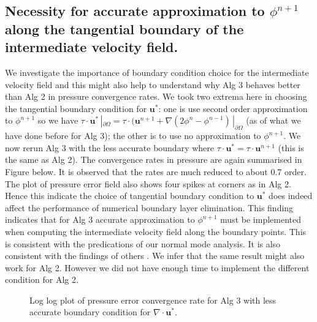 \subsection*{Necessity for accurate approximation to $\phi^{n+1}$ along the tangential boundary of the intermediate velocity field.}
We investigate the importance of boundary condition choice for the intermediate velocity field and this might also help to understand why Alg 3 behaves better than Alg 2 in pressure convergence rates. We took two extrema here in choosing the tangential boundary condition for $\textbf{u}^*$: one is use second order approximation to $\phi^{n+1}$ so we have $\textbf{$\tau$} \cdot \textbf{u}^* \,|_{\partial \Omega} = \textbf{$\tau$} \cdot (\textbf{u}^{n+1} + \nabla (2\phi^n - \phi^{n-1})\,|_{\partial \Omega}$ (as of what we have done before for Alg 3); the other is to use no approximation to $\phi^{n+1}$. We now rerun Alg 3 with the less accurate boundary where $\textbf{$\tau$} \cdot \textbf{u}^* = \textbf{$\tau$} \cdot \textbf{u}^{n+1}$ (this is the same as Alg 2). The convergence rates in pressure are again summarised in Figure below. It is observed that the rates are much reduced to about 0.7 order. The plot of pressure error field also shows four spikes at corners as in Alg 2. Hence this indicate the choice of tangential boundary condition to $\textbf{u}^*$ does indeed affect the performance of numerical boundary layer elimination. This finding indicates that for Alg 3 accurate approximation to $\phi^{n+1}$ must be implemented when computing the intermediate velocity field along the boundary points. This is consistent with the predications of our normal mode analysis. It is also consistent with the findings of others \cite{brown2001accurate}. We infer that the same result might also work for Alg 2. However we did not have enough time to implement the different condition for Alg 2.

\begin{figure}[H]
	\centering
	\caption{Log log plot of pressure error convergence rate for Alg 3 with less accurate boundary condition for $\nabla \cdot \textbf{u}^*$. }\label{fig:6.20}
\end{figure}
	
